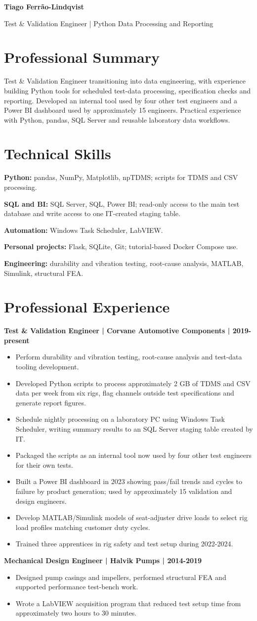 \documentclass[11pt,a4paper]{article}
\newcommand{\cvsection}[1]{\section*{#1}}
\begin{document}
{\LARGE\bfseries\color{primarycolor} Tiago Ferrão-Lindqvist}\par
{\color{accentcolor} Test \& Validation Engineer | Python Data Processing and Reporting}

\cvsection{Professional Summary}
Test \& Validation Engineer transitioning into data engineering, with experience building Python tools for scheduled test-data processing, specification checks and reporting. Developed an internal tool used by four other test engineers and a Power BI dashboard used by approximately 15 engineers. Practical experience with Python, pandas, SQL Server and reusable laboratory data workflows.

\cvsection{Technical Skills}
\textbf{Python:} pandas, NumPy, Matplotlib, npTDMS; scripts for TDMS and CSV processing.\par
\textbf{SQL and BI:} SQL Server, SQL, Power BI; read-only access to the main test database and write access to one IT-created staging table.\par
\textbf{Automation:} Windows Task Scheduler, LabVIEW.\par
\textbf{Personal projects:} Flask, SQLite, Git; tutorial-based Docker Compose use.\par
\textbf{Engineering:} durability and vibration testing, root-cause analysis, MATLAB, Simulink, structural FEA.

\cvsection{Professional Experience}
\textbf{Test \& Validation Engineer | Corvane Automotive Components | 2019-present}
\begin{itemize}
\item Perform durability and vibration testing, root-cause analysis and test-data tooling development.
\item Developed Python scripts to process approximately 2 GB of TDMS and CSV data per week from six rigs, flag channels outside test specifications and generate report figures.
\item Schedule nightly processing on a laboratory PC using Windows Task Scheduler, writing summary results to an SQL Server staging table created by IT.
\item Packaged the scripts as an internal tool now used by four other test engineers for their own tests.
\item Built a Power BI dashboard in 2023 showing pass/fail trends and cycles to failure by product generation; used by approximately 15 validation and design engineers.
\item Develop MATLAB/Simulink models of seat-adjuster drive loads to select rig load profiles matching customer duty cycles.
\item Trained three apprentices in rig safety and test setup during 2022-2024.
\end{itemize}
\textbf{Mechanical Design Engineer | Halvik Pumps | 2014-2019}
\begin{itemize}
\item Designed pump casings and impellers, performed structural FEA and supported performance test-bench work.
\item Wrote a LabVIEW acquisition program that reduced test setup time from approximately two hours to 30 minutes.
\end{itemize}
\end{document}
